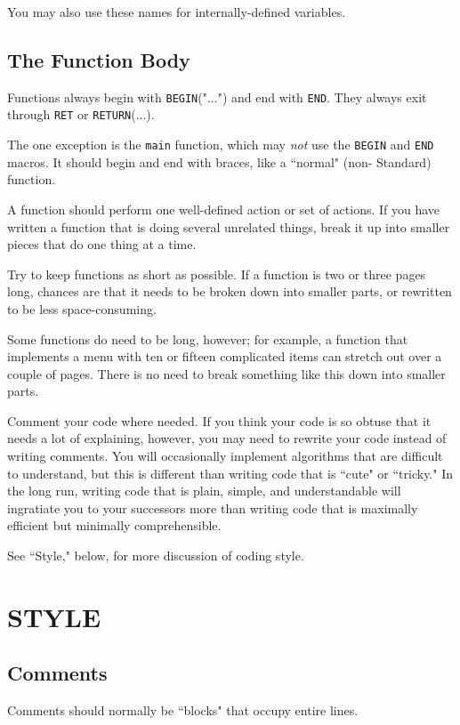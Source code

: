 You may also use these names for internally-defined variables.

\subsection{The Function Body}

Functions always begin with {\tt BEGIN}("...") and end with {\tt END}.
They always exit through {\tt RET} or {\tt RETURN}(...).

The one exception is the {\tt main} function, which may {\em not} use
the {\tt BEGIN} and {\tt END} macros.  It should begin and end with
braces, like a ``normal" (non- Standard) function.

A function should perform one well-defined action or set of actions.
If you have written a function that is doing several unrelated things,
break it up into smaller pieces that do one thing at a time.

Try to keep functions as short as possible.  If a function is two or
three pages long, chances are that it needs to be broken down into
smaller parts, or rewritten to be less space-consuming.

Some functions do need to be long, however; for example, a function
that implements a menu with ten or fifteen complicated items can
stretch out over a couple of pages.  There is no need to break
something like this down into smaller parts.

Comment your code where needed.  If you think your code is so obtuse
that it needs a lot of explaining, however, you may need to rewrite
your code instead of writing comments.  You will occasionally
implement algorithms that are difficult to understand, but this is
different than writing code that is ``cute" or ``tricky."  In the long
run, writing code that is plain, simple, and understandable will
ingratiate you to your successors more than writing code that is
maximally efficient but minimally comprehensible.

See ``Style," below, for more discussion of coding style.

\section{STYLE}
\subsection{Comments}

Comments should normally be ``blocks" that occupy
entire lines.

